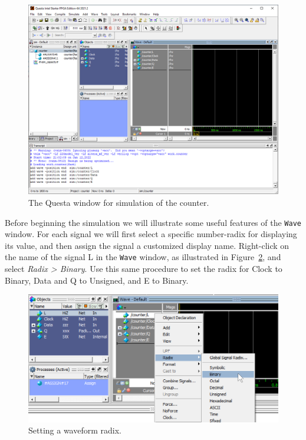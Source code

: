 \documentclass[11pt, twoside, pdftex]{article}
\begin{document}
\begin{figure}[H]
   \begin{center}
      \includegraphics[width=.95\textwidth]{figures/counter_main.png}
   \caption{The Questa window for simulation of the counter.} 
	 \label{fig:counter_main}
	 \end{center}
\end{figure}

Before beginning the simulation we will illustrate some useful features of the \texttt{Wave} window.
For each signal we will first select a specific number-radix for displaying its value, and 
then assign the signal a customized display name. Right-click on the name of the 
signal {\sf L} in the \texttt{Wave} 
window, as illustrated in Figure~\ref{fig:counter_radix}, and select {\it Radix > Binary}. Use 
this same procedure to set the radix for {\sf Clock} to {\sf Binary}, {\sf Data} and {\sf Q}
to {\sf Unsigned}, and {\sf E} to {\sf Binary}.

\begin{figure}[H]
   \begin{center}
      \includegraphics[scale=.75]{figures/counter_radix.png}
   \caption{Setting a waveform radix.} 
	 \label{fig:counter_radix}
	 \end{center}
\end{figure}
\end{document}
